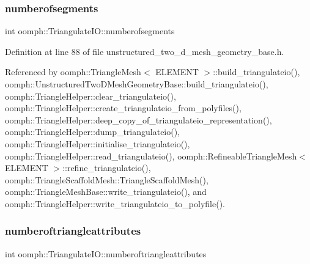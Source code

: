 \mbox{\label{structoomph_1_1TriangulateIO_a8344f9d855e55a6af46640818ba4886b}} 
\subsubsection{\texorpdfstring{numberofsegments}{numberofsegments}}
{\footnotesize\ttfamily int oomph\+::\+Triangulate\+I\+O\+::numberofsegments}



Definition at line 88 of file unstructured\+\_\+two\+\_\+d\+\_\+mesh\+\_\+geometry\+\_\+base.\+h.



Referenced by oomph\+::\+Triangle\+Mesh$<$ E\+L\+E\+M\+E\+N\+T $>$\+::build\+\_\+triangulateio(), oomph\+::\+Unstructured\+Two\+D\+Mesh\+Geometry\+Base\+::build\+\_\+triangulateio(), oomph\+::\+Triangle\+Helper\+::clear\+\_\+triangulateio(), oomph\+::\+Triangle\+Helper\+::create\+\_\+triangulateio\+\_\+from\+\_\+polyfiles(), oomph\+::\+Triangle\+Helper\+::deep\+\_\+copy\+\_\+of\+\_\+triangulateio\+\_\+representation(), oomph\+::\+Triangle\+Helper\+::dump\+\_\+triangulateio(), oomph\+::\+Triangle\+Helper\+::initialise\+\_\+triangulateio(), oomph\+::\+Triangle\+Helper\+::read\+\_\+triangulateio(), oomph\+::\+Refineable\+Triangle\+Mesh$<$ E\+L\+E\+M\+E\+N\+T $>$\+::refine\+\_\+triangulateio(), oomph\+::\+Triangle\+Scaffold\+Mesh\+::\+Triangle\+Scaffold\+Mesh(), oomph\+::\+Triangle\+Mesh\+Base\+::write\+\_\+triangulateio(), and oomph\+::\+Triangle\+Helper\+::write\+\_\+triangulateio\+\_\+to\+\_\+polyfile().

\mbox{\label{structoomph_1_1TriangulateIO_a51314a924a2c9ddd3490853b81dc61a7}} 
\subsubsection{\texorpdfstring{numberoftriangleattributes}{numberoftriangleattributes}}
{\footnotesize\ttfamily int oomph\+::\+Triangulate\+I\+O\+::numberoftriangleattributes}



